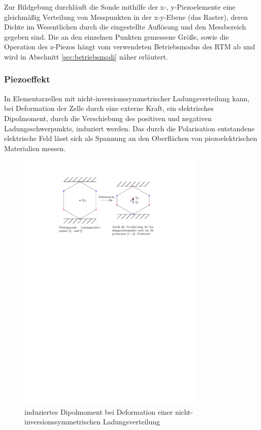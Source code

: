 \documentclass[10pt, a4paper]{article}
\begin{document}
Zur Bildgebung durchläuft die Sonde mithilfe der x-, y-Piezoelemente eine gleichmäßig Verteilung von Messpunkten in der x-y-Ebene (das Raster), deren Dichte im Wesentlichen durch die eingestellte Auflösung und den Messbereich gegeben sind.
Die an den einzelnen Punkten gemessene Größe, sowie die Operation des z-Piezos hängt vom verwendeten Betriebsmodus des RTM ab und wird in Abschnitt \ref{sec:betriebsmodi} näher erläutert.


\subsubsection{Piezoeffekt}
\label{sssec:Piezoeffekt}
In Elementarzellen mit nicht-inversionssymmetrischer Ladungsverteilung kann, bei Deformation der Zelle durch eine externe Kraft, ein elektrisches Dipolmoment, durch die Verschiebung des positiven und negativen Ladungsschwerpunkts, induziert werden.
Das durch die Polarisation entstandene elektrische Feld lässt sich als Spannung an den Oberflächen von piezoelektrischen Materialien messen.
\begin{figure}[h]
\centering
\includegraphics[width=0.8\textwidth]{./grafiken/piezoeffekt.pdf}
\caption{induziertes Dipolmoment bei Deformation einer nicht-inversionssymmetrischen Ladungsverteilung}
\label{fig:aufbau}
\end{figure}
\end{document}
